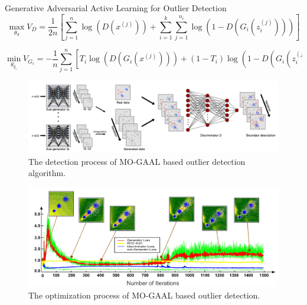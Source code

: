 \documentclass[final]{beamer}
\newlength{\colwidth}
\begin{document}
\begin{frame}[t]
\begin{columns}[t]
\begin{column}{\colwidth}
\begin{exampleblock}{Generative Adversarial Active Learning for Outlier Detection}
    $$
    \max_{\theta_d}V_D=\frac{1}{2n}[\sum_{j=1}^{n}\log(D(x^{(j)})) + \sum_{i=1}^{k}\sum_{j=1}^{n_i}\log(1-D(G_i(z_i^{(j)})))]
    $$
    
    $$
    \min_{\theta_{g_i}}V_{G_i}=-\frac{1}{n}\sum_{j=1}^{n}[T_i\log(D(G_i(x^{(j)}))) + (1-T_i)\log(1-D(G_i(z_i^{(j)})))]
    $$
    
    \begin{figure}
    	\centering
    	\includegraphics{figures/MO-GAAL.png}
    	\caption{The detection process of MO-GAAL based outlier detection algorithm.}
    \end{figure}

    \begin{figure}
        \centering
	    \includegraphics[scale=0.9]{figures/process of MO-GAAL.png}
	    \caption{The optimization process of MO-GAAL based outlier detection.}
    \end{figure}
  	
  \end{exampleblock}


\end{column}
\end{columns}
\end{frame}
\end{document}
